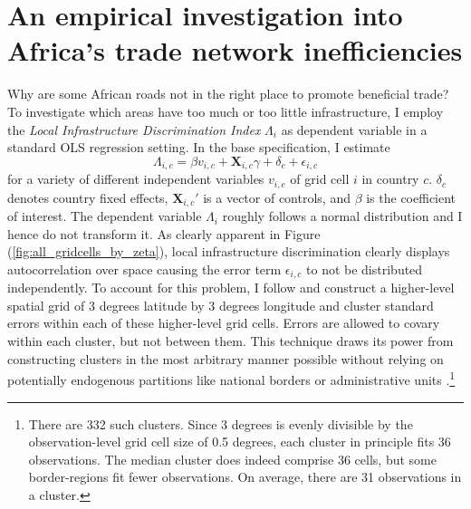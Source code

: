 \documentclass[11pt, oneside]{article}   	%
\let\oldref\ref
\renewcommand{\ref}[1]{(\oldref{#1})}
\begin{document}
\section{An empirical investigation into Africa's trade network inefficiencies}
\label{chap:results}
Why are some African roads not in the right place to promote beneficial trade? To investigate which areas have too much or too little infrastructure, I employ the \emph{Local Infrastructure Discrimination Index} $\Lambda_{i}$ as dependent variable in a standard OLS regression setting. In the base specification, I estimate
\begin{equation}
  \Lambda_{i,c} = \beta v_{i,c} + \textbf{X}_{i,c}\gamma + \delta_{c} + \epsilon_{i,c}
  \label{eq:grid_ols}
\end{equation}
for a variety of different independent variables $v_{i,c}$ of grid cell $i$ in country $c$. $\delta_{c}$ denotes country fixed effects, $\textbf{X}_{i,c}'$ is a vector of controls, and $\beta$ is the coefficient of interest. The dependent variable $\Lambda_{i}$ roughly follows a normal distribution and I hence do not transform it. As clearly apparent in Figure \ref{fig:all_gridcells_by_zeta}, local infrastructure discrimination clearly displays autocorrelation over space causing the error term $\epsilon_{i,c}$ to not be distributed independently. To account for this problem, I follow \cite{Bester_Inferencedependentdata_2011} and construct a higher-level spatial grid of 3 degrees latitude by 3 degrees longitude and cluster standard errors within each of these higher-level grid cells. Errors are  allowed to covary within each cluster, but not between them. This technique draws its power from constructing clusters in the most arbitrary manner possible without relying on potentially endogenous partitions like national borders or administrative units \citep[see e.g.][]{michaels_resetting_2017}.\footnote{There are 332 such clusters. Since 3 degrees is evenly divisible by the observation-level grid cell size of 0.5 degrees, each cluster in principle fits 36 observations. The median cluster does indeed comprise 36 cells, but some border-regions fit fewer observations. On average, there are 31 observations in a cluster.}
\end{document}
